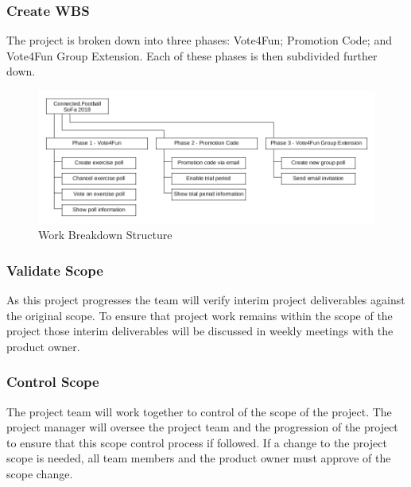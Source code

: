 \subsubsection{Create WBS}
\label{sssec:create_wbs}

The project is broken down into three phases: Vote4Fun; Promotion Code; and Vote4Fun Group Extension. Each of these phases is then subdivided further down.

\begin{figure}[H]
	\includegraphics[width=\textwidth]{images/wbs.png}
	\caption{Work Breakdown Structure}
    \label{fig:wbs}
\end{figure}

\subsubsection{Validate Scope}
\label{sssec:validate_scope}
    
As this project progresses the team will verify interim project deliverables against the original scope. To ensure that project work remains within the scope of the project those interim deliverables will be discussed in weekly meetings with the product owner.

\subsubsection{Control Scope}
\label{sssec:control_scope}

The project team will work together to control of the scope of the project. The project manager will oversee the project team and the progression of the project to ensure that this scope control process if followed.
\newline
If a change to the project scope is needed, all team members and the product owner must approve of the scope change.



